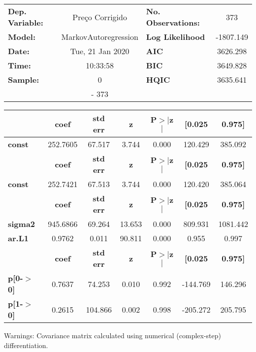 \begin{center}
\begin{tabular}{lclc}
\toprule
\textbf{Dep. Variable:} &   Preço Corrigido    & \textbf{  No. Observations:  } &    373      \\
\textbf{Model:}         & MarkovAutoregression & \textbf{  Log Likelihood     } & -1807.149   \\
\textbf{Date:}          &   Tue, 21 Jan 2020   & \textbf{  AIC                } &  3626.298   \\
\textbf{Time:}          &       10:33:58       & \textbf{  BIC                } &  3649.828   \\
\textbf{Sample:}        &          0           & \textbf{  HQIC               } &  3635.641   \\
\textbf{}               &         - 373        & \textbf{                     } &             \\
\bottomrule
\end{tabular}
\begin{tabular}{lcccccc}
               & \textbf{coef} & \textbf{std err} & \textbf{z} & \textbf{P$>$$|$z$|$} & \textbf{[0.025} & \textbf{0.975]}  \\
\midrule
\textbf{const} &     252.7605  &       67.517     &     3.744  &         0.000        &      120.429    &      385.092     \\
               & \textbf{coef} & \textbf{std err} & \textbf{z} & \textbf{P$>$$|$z$|$} & \textbf{[0.025} & \textbf{0.975]}  \\
\midrule
\textbf{const} &     252.7421  &       67.513     &     3.744  &         0.000        &      120.420    &      385.064     \\
                & \textbf{coef} & \textbf{std err} & \textbf{z} & \textbf{P$>$$|$z$|$} & \textbf{[0.025} & \textbf{0.975]}  \\
\midrule
\textbf{sigma2} &     945.6866  &       69.264     &    13.653  &         0.000        &      809.931    &     1081.442     \\
\textbf{ar.L1}  &       0.9762  &        0.011     &    90.811  &         0.000        &        0.955    &        0.997     \\
                   & \textbf{coef} & \textbf{std err} & \textbf{z} & \textbf{P$>$$|$z$|$} & \textbf{[0.025} & \textbf{0.975]}  \\
\midrule
\textbf{p[0-$>$0]} &       0.7637  &       74.253     &     0.010  &         0.992        &     -144.769    &      146.296     \\
\textbf{p[1-$>$0]} &       0.2615  &      104.866     &     0.002  &         0.998        &     -205.272    &      205.795     \\
\bottomrule
\end{tabular}
\end{center}

Warnings: \newline
 [1] Covariance matrix calculated using numerical (complex-step) differentiation.